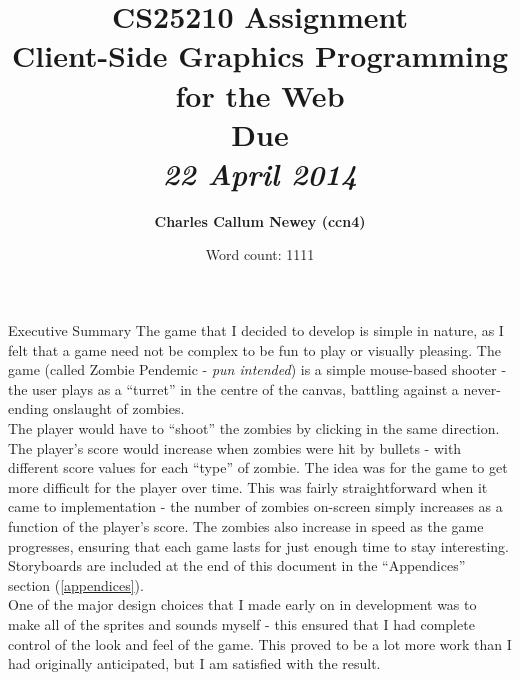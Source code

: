 \documentclass[11pt]{article}
\title{
\vspace{2in}
\textmd{\textbf{CS25210 Assignment \\ Client-Side Graphics Programming for the Web}}\\
\normalsize\vspace{0.1in}\small{Due}\\
\vspace{0.1in}\large{\textit{22 April 2014}}
\vspace{3in}
}
\author{\textbf{Charles Callum Newey (ccn4)}}
\date{Word count: 1111}
\begin{document}
\maketitle
\newpage
\tableofcontents
\newpage

\begin{section}{Executive Summary}
    The game that I decided to develop is simple in nature, as I felt that a game need not be complex to be fun to play or visually pleasing. The game (called Zombie Pendemic - \textit{pun intended}) is a simple mouse-based shooter - the user plays as a ``turret'' in the centre of the canvas, battling against a never-ending onslaught of zombies. \\
    
    The player would have to ``shoot'' the zombies by clicking in the same direction. The player's score would increase when zombies were hit by bullets - with different score values for each ``type'' of zombie. The idea was for the game to get more difficult for the player over time. This was fairly straightforward when it came to implementation - the number of zombies on-screen simply increases as a function of the player's score. The zombies also increase in speed as the game progresses, ensuring that each game lasts for just enough time to stay interesting. Storyboards are included at the end of this document in the ``Appendices'' section (\ref{appendices}). \\
    
    One of the major design choices that I made early on in development was to make all of the sprites and sounds myself - this ensured that I had complete control of the look and feel of the game. This proved to be a lot more work than I had originally anticipated, but I am satisfied with the result.
\end{section}
\end{document}
